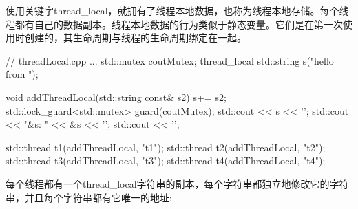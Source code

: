 
使用关键字thread\_local，就拥有了线程本地数据，也称为线程本地存储。每个线程都有自己的数据副本。线程本地数据的行为类似于静态变量。它们是在第一次使用时创建的，其生命周期与线程的生命周期绑定在一起。


\begin{cpp}
	// threadLocal.cpp
	...
	std::mutex coutMutex;
	thread_local std::string s("hello from ");
	
	void addThreadLocal(std::string const& s2){
		s+= s2;
		std::lock_guard<std::mutex> guard(coutMutex);
		std::cout << s << '\n';
		std::cout << "&s: " << &s << '\n';
		std::cout << '\n';
	}
	
	std::thread t1(addThreadLocal, "t1");
	std::thread t2(addThreadLocal, "t2");
	std::thread t3(addThreadLocal, "t3");
	std::thread t4(addThreadLocal, "t4");
\end{cpp}

每个线程都有一个thread\_local字符串的副本，每个字符串都独立地修改它的字符串，并且每个字符串都有它唯一的地址:













































